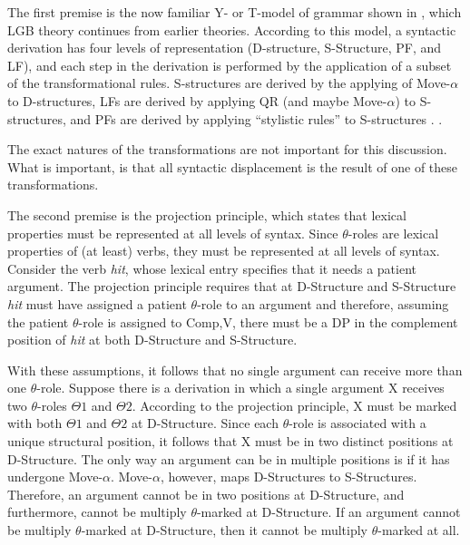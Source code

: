 \documentclass[MilwayThesis]{subfiles}
\begin{document}
The first premise is the now familiar Y- or T-model of grammar shown in \Next, which LGB theory continues from earlier theories.
According to this model, a syntactic derivation has four levels of representation (D-structure, S-Structure, PF, and LF), and each step in the derivation is performed by the application of a subset of the transformational rules.
S-structures are derived by the applying of Move-$\alpha$ to D-structures, LFs are derived by applying QR (and maybe Move-$\alpha$) to S-structures, and PFs are derived by applying ``stylistic rules'' to S-structures \parencite[18]{chomsky1981lectures}.
\ex. 

The exact natures of the transformations are not important for this discussion.
What is important, is that all syntactic displacement is the result of one of these transformations.

The second premise is the projection principle, which states that lexical properties must be represented at all levels of syntax.
Since $\theta$-roles are lexical properties of (at least) verbs, they must be represented at all levels of syntax.
Consider the verb \textit{hit}, whose lexical entry specifies that it needs a patient argument.
The projection principle requires that at D-Structure and S-Structure \textit{hit} must have assigned a patient $\theta$-role to an argument and therefore, assuming the patient $\theta$-role is assigned to Comp,V, there must be a DP in the complement position of \textit{hit} at both D-Structure and S-Structure.

With these assumptions, it follows that no single argument can receive more than one $\theta$-role.
Suppose there is a derivation in which a single argument X receives two $\theta$-roles $\Theta1$ and $\Theta2$.
According to the projection principle, X must be marked with both $\Theta1$ and $\Theta2$ at D-Structure.
Since each $\theta$-role is associated with a unique structural position, it follows that X must be in two distinct positions at D-Structure.
The only way an argument can be in multiple positions is if it has undergone Move-$\alpha$.
Move-$\alpha$, however, maps D-Structures to S-Structures.
Therefore, an argument cannot be in two positions at D-Structure, and furthermore, cannot be multiply $\theta$-marked at D-Structure.
If an argument cannot be multiply $\theta$-marked at D-Structure, then it cannot be multiply $\theta$-marked at all.
\end{document}
